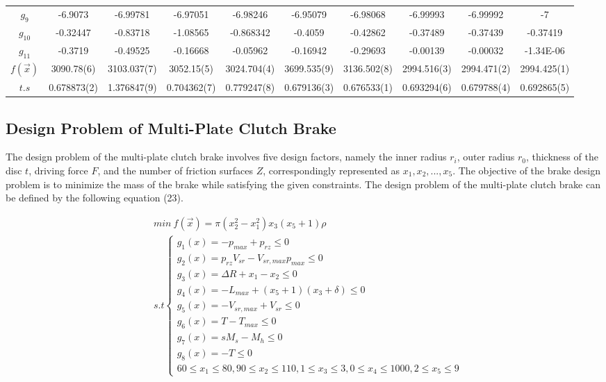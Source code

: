 \documentclass[preprint,review,compress,12pt]{elsarticle}
\begin{document}
\begin{table}[H]
{\begin{tabular}{cccccccccc}
$g_9$  & -6.9073  & -6.99781 & -6.97051  & -6.98246 & -6.95079 & -6.98068 & -6.99993  & -6.99992  & -7        \\
$g_10$  & -0.32447 & -0.83718 & -1.08565  & -0.868342 & -0.4059  & -0.42862 & -0.37489  & -0.37439  & -0.37419  \\
$g_11$ & -0.3719  & -0.49525 & -0.16668  & -0.05962 & -0.16942 & -0.29693 & -0.00139  & -0.00032  & -1.34E-06 \\
\midrule
$f(\vec{x})$  & 3090.78(6)  & 3103.037(7) & 3052.15(5)   & 3024.704(4) & 3699.535(9) & 3136.502(8) & 2994.516(3)  & 2994.471(2)  & 2994.425(1) \\
$t.s$ & 0.678873(2) & 1.376847(9) & 0.704362(7) & 0.779247(8) & 0.679136(3) & 0.676533(1) & 0.693294(6) & 0.679788(4) & 0.692865(5) \\
\bottomrule

\end{tabular}}
\end{table}

\subsection{Design Problem of Multi-Plate Clutch Brake}
The design problem of the multi-plate clutch brake involves five design factors, namely the inner radius $r_i$, outer radius $r_0$, thickness of the disc $t$, driving force $F$, and the number of friction surfaces $Z$, correspondingly represented as $x_1, x_2, ..., x_5$. The objective of the brake design problem is to minimize the mass of the brake while satisfying the given constraints. The design problem of the multi-plate clutch brake can be defined by the following equation (23).


\begin{equation}  \begin{split}  
&min\ f(\vec{x}) = \pi (x^2_2 − x^2_1)x_3(x_5 + 1)\rho   \\
&s.t\left\{\begin{matrix} g_1(x) = −p_{max}+p_{rz}\le 0 \\ 
g_2(x) = p_{rz}V_{sr}-V_{sr,max}p_{max}\le 0 \\ 
g_3(x) = \Delta R + x_1-x_2\le 0 \\ 
g_4(x) = -L_{max} +(x_5+1)(x_3+\delta )\le 0 \\ 
g_5(x) = -V_{sr,max}+V_{sr}\le 0 \\
g_6(x) = T-T_{max} \le 0 \\
g_7(x) = sM_s-M_h\le 0 \\ 
g_8(x) = -T \le 0 \\
60 \le x_1\le 80, 90 \le x_2\le 110,1 \le x_3 \le 3,0 \le x_4\le 1000,2 \le x_5 \le 9\end{matrix}\right.\\  
\end{split}  
\end{equation}
\end{document}
